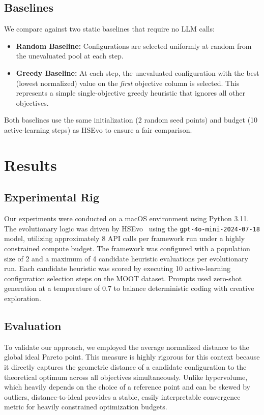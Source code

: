 \documentclass[sigconf,nonacm]{acmart}
\begin{document}
\subsection{Baselines}

We compare against two static baselines that require no LLM calls:
\begin{itemize}
\item \textbf{Random Baseline:} Configurations are selected uniformly at random from the unevaluated pool at each step.
\item \textbf{Greedy Baseline:} At each step, the unevaluated configuration with the best (lowest normalized) value on the \emph{first} objective column is selected. This represents a simple single-objective greedy heuristic that ignores all other objectives.
\end{itemize}
Both baselines use the same initialization (2 random seed points) and budget (10 active-learning steps) as HSEvo to ensure a fair comparison.

\section{Results}

\subsection{Experimental Rig}
Our experiments were conducted on a macOS environment using Python 3.11. The evolutionary logic was driven by HSEvo~\cite{dat2025hsevo} using the \texttt{gpt-4o-mini-2024-07-18} model, utilizing approximately 8 API calls per framework run under a highly constrained compute budget. The framework was configured with a population size of 2 and a maximum of 4 candidate heuristic evaluations per evolutionary run. Each candidate heuristic was scored by executing 10 active-learning configuration selection steps on the MOOT dataset. Prompts used zero-shot generation at a temperature of 0.7 to balance deterministic coding with creative exploration.

\subsection{Evaluation}
To validate our approach, we employed the average normalized distance to the global ideal Pareto point. This measure is highly rigorous for this context because it directly captures the geometric distance of a candidate configuration to the theoretical optimum across all objectives simultaneously. Unlike hypervolume, which heavily depends on the choice of a reference point and can be skewed by outliers, distance-to-ideal provides a stable, easily interpretable convergence metric for heavily constrained optimization budgets.
\end{document}
